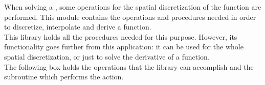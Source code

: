 When solving a ,  some operations for the spatial discretization of the function are
performed. This module contains the operations and procedures needed in order to discretize, interpolate and derive a function. \\

This library holds all the procedures needed for this purpose. However, its
functionality goes further from this application: it can be used for the whole
spatial discretization, or just to solve the derivative of a function. \\

The following box holds the operations that the library can accomplish and the
subroutine which performs the action.\\

